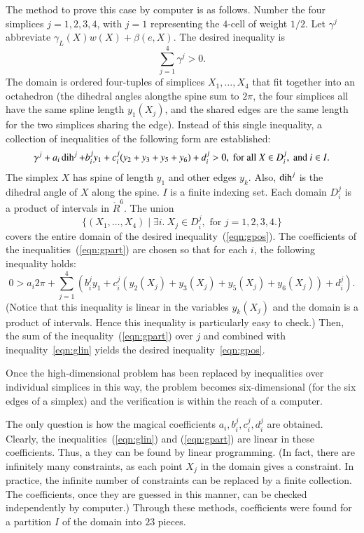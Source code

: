 The method to prove this case by computer is as follows.  Number the four simplices $j=1,2,3,4$, with $j=1$ representing the $4$-cell of weight $1/2$.  Let $\gamma^j$ abbreviate $\gamma_L(X)w(X) + \beta(e,X)$.   The desired inequality is
\begin{equation}\label{eqn:gpos}
\sum_{j=1}^4 \gamma^j > 0.
\end{equation}
The domain is ordered four-tuples of simplices $X_1,\ldots,X_4$ that fit together into an octahedron (the dihedral angles alongthe spine sum to $2\pi$, the four simplices all have the same spline length $y_1(X_j)$, and the shared edges are the same length for the two simplices sharing the edge).
Instead of this single inequality,  a collection of inequalities of the following form are established:
\begin{equation}\label{eqn:gpart}
\gamma^j + a_i \operatorname{dih}^j + b_i^j y_1 + c_i^j (y_2+y_3+y_5+y_6) + d_i^j > 0, \text{ for all } X \in D_i^j, \text{ and } i \in I. 
\end{equation}
The simplex $X$ has spine of length $y_1$ and other edges $y_k$.  Also, $\operatorname{dih}^j$ is the dihedral angle of $X$ along the spine.
$I$ is a finite indexing set.  Each domain $D_i^j$ is a product of intervals in $\ring{R}^6$.  The union 
$$
\{(X_1,\ldots,X_4)\mid \exists i.~ X_j \in D_i^j,\text{ for } j=1,2,3,4.\}
$$
covers the entire domain of the desired inequality~(\ref{eqn:gpos}).  The coefficients of the inequalities~(\ref{eqn:gpart})
are chosen so that for each $i$, the following inequality holds:
\begin{equation}\label{eqn:glin}
0 > a_i 2\pi + \sum_{j=1}^4 (b_i^j y_1 +  c_i^j (y_2(X_j)+y_3(X_j)+y_5(X_j)+y_6(X_j)) + d_i^j).
\end{equation}
(Notice that this inequality is linear in the variables $y_k(X_j)$ and the domain is a product of intervals.  Hence this inequality is particularly easy to check.)
Then, the sum of the inequality~(\ref{eqn:gpart}) over $j$ and combined with inequality~\ref{eqn:glin} yields the desired inequality~\ref{eqn:gpos}.

Once the high-dimensional problem has been replaced by inequalities over individual simplices in this way, the problem becomes six-dimensional (for the six edges of a simplex) and the verification is within the reach of  a computer.

The only question is how the magical coefficients $a_i,b_i^j,c_i^j,d_i^j$ are obtained.  Clearly, the inequalities~(\ref{eqn:glin}) and (\ref{eqn:gpart}) are linear in these coefficients.  Thus, a they can be found by linear programming.  (In fact, there are infinitely many constraints, as each point $X_j$ in the domain gives a constraint.  In practice, the infinite number of constraints can be replaced by a finite collection.  The coefficients, once they are guessed in this manner, can be checked independently by computer.)  Through these methods, coefficients were found for a partition $I$ of the domain into $23$ pieces.

